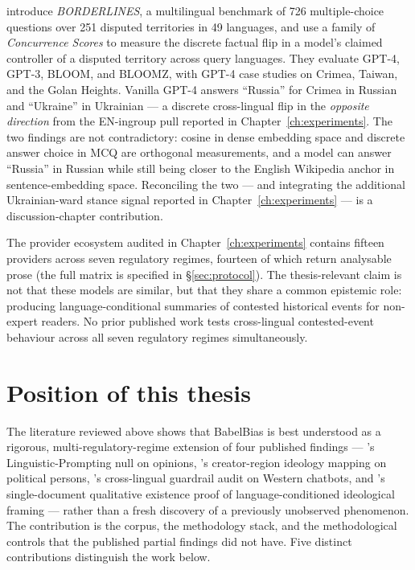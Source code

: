 {\sloppy
\citet{li2024borderlines} introduce \emph{BORDERLINES}, a multilingual
benchmark of 726 multiple-choice questions over 251 disputed territories
in 49 languages, and use a family of \emph{Concurrence Scores} to
measure the discrete
factual flip in a model's claimed controller of a disputed territory
across query languages. They evaluate GPT-4, GPT-3, BLOOM, and BLOOMZ,
with GPT-4 case studies on Crimea, Taiwan, and the Golan Heights. Vanilla
GPT-4 answers ``Russia'' for Crimea in Russian and ``Ukraine'' in
Ukrainian --- a discrete cross-lingual flip in the \emph{opposite
direction} from the EN-ingroup pull reported in
Chapter~\ref{ch:experiments}. The two findings are not
contradictory: cosine in dense embedding space and discrete answer
choice in MCQ are orthogonal measurements, and a model can answer
``Russia'' in Russian while still being closer to the English Wikipedia
anchor in sentence-embedding space. Reconciling the two --- and
integrating the additional Ukrainian-ward stance signal reported in
Chapter~\ref{ch:experiments} --- is a discussion-chapter
contribution.\par}

The provider ecosystem audited in
Chapter~\ref{ch:experiments} contains fifteen providers across seven
regulatory regimes, fourteen of which return analysable prose (the
full matrix is specified in \S\ref{sec:protocol}). The
thesis-relevant claim is not
that these models are similar, but that they share a common epistemic
role: producing language-conditional summaries of contested historical
events for non-expert readers. No prior published work tests
cross-lingual contested-event behaviour across all seven regulatory
regimes simultaneously.

\section{Position of this thesis}\label{sec:novelty}

The literature reviewed above shows that BabelBias is best understood as
a rigorous, multi-regulatory-regime extension of four published findings
--- \citet{durmus2023globalopinionqa}'s Linguistic-Prompting null on
opinions, \citet{buyl2024llm}'s creator-region ideology mapping on
political persons, \citet{urman2025silence}'s cross-lingual guardrail
audit on Western chatbots, and \citet{smirnov2026language}'s
single-document qualitative existence proof of language-conditioned
ideological framing --- rather than a fresh discovery of a previously
unobserved phenomenon. The contribution is the corpus,
the methodology stack, and the methodological controls that the
published partial findings did not have. Five distinct contributions
distinguish the work below.


